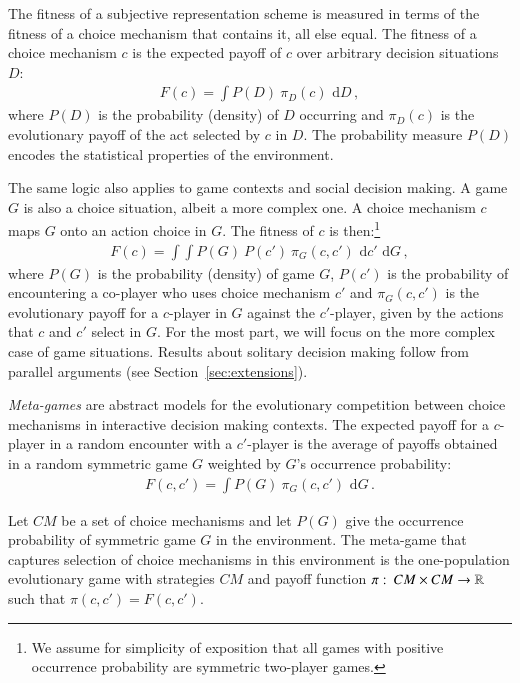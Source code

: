 \documentclass[fleqn,reqno,11pt]{article}
\begin{document}
The fitness of a subjective representation scheme is measured in terms of the fitness of a
choice mechanism that contains it, all else equal. The fitness of a choice mechanism $c$ is the
expected payoff of $c$ over arbitrary decision situations $D$:
\begin{align}
  \label{eq:FittnessChoiceMechSolitary}
  F(c) = \int P(D) \  \pi_D(c) \text{ d} D \,,
\end{align}
where $P(D)$ is the probability (density) of $D$ occurring and $\pi_D(c)$ is the evolutionary payoff of
the act selected by $c$ in $D$. The probability measure $P(D)$ encodes the statistical
properties of the environment.

The same logic also applies to game contexts and social decision making. A game $G$ is also a
choice situation, albeit a more complex one. A choice mechanism $c$ maps $G$ onto an action
choice in $G$. The fitness of $c$ is then:\footnote{We assume for simplicity of exposition that
  all games with positive occurrence probability are symmetric two-player games.}
\begin{align}
  \label{eq:FittnessChoiceMechGame}
  F(c) = \int \int P(G) \  P(c') \  \pi_G(c,c') \text{ d} c' \text{ d} G  \,,
\end{align}
where $P(G)$ is the probability (density) of game $G$, $P(c')$ is the probability of
encountering a co-player who uses choice mechanism $c'$ and $\pi_G(c,c')$ is the evolutionary payoff for
a $c$-player in $G$ against the $c'$-player, given by the actions that $c$
and $c'$ select in $G$. For the most part, we will focus on the more complex case of game situations. Results about solitary decision making follow from parallel arguments
(see Section~\ref{sec:extensions}).

\emph{Meta-games} are abstract models for the evolutionary competition between choice
mechanisms in interactive decision making contexts. The expected payoff for a $c$-player in a random
encounter with a $c'$-player is the average of payoffs obtained in a random symmetric game $G$ weighted
by $G$'s occurrence probability:
\begin{align}
  \label{eq:FittnessChoiceMechGamePairwise}
  F(c, c') = \int P(G) \  \pi_G(c,c') \text{ d} G \,.
\end{align}

\begin{definition}
  \label{def:MetaGame}
  Let $CM$ be a set of choice mechanisms and let $P(G)$ give the occurrence probability of symmetric game
  $G$ in the environment. The meta-game that captures selection of choice mechanisms in this
  environment is the one-population evolutionary game with strategies $CM$ and payoff function
  $\pi \thinspace \colon \thinspace CM \times CM \rightarrow \mathbb{R}$ such that
  $\pi(c,c') = F(c,c')$.
\end{definition}
\end{document}
